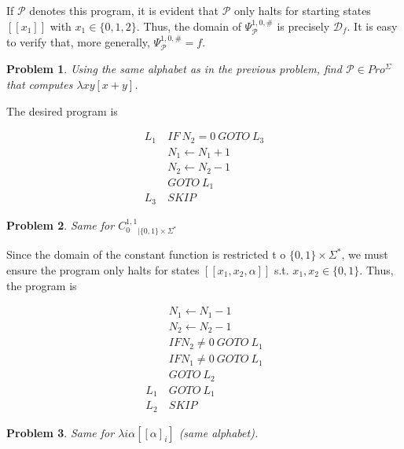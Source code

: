\documentclass[a4paper, 12pt]{article}
\newtheorem{problem}{Problem}
\newtheorem{problem}{Problem}
\begin{document}
If $\mathcal{P}$ denotes this program, it is evident that $\mathcal{P}$ only
halts for starting states $[\![ x_1 ]\!]$ with $x_1 \in \{0, 1, 2\}$.
Thus, the domain of $\Psi_{\mathcal{P}}^{1, 0, \#}$ is precisely
$\mathcal{D}_f$. It is easy to verify that, more generally,
$\Psi_{\mathcal{P}}^{1, 0, \#} = f$.

\begin{problem}
    Using the same alphabet as in the previous problem, find $\mathcal{P} \in
    Pro^{\Sigma}$ that computes $\lambda xy[x + y]$.
\end{problem}

The desired program is 

\begin{align*}
    L_1 ~ &IF ~ N_2 = 0 ~ GOTO ~ L_3 \\ 
          &N_1 \leftarrow N_1 + 1 \\ 
          &N_2 \leftarrow N_2 - 1 \\ 
          &GOTO ~ L_1\\
    L_3 ~ & SKIP
\end{align*}

\begin{problem}
    Same for $C_0^{1, 1}_{\mid \{0, 1\} \times  \Sigma^{*}}$
\end{problem}

Since the domain of the constant function is restricted t o $\{0, 1\} \times
\Sigma^{*}$, we must ensure the program only halts for states $[\![ x_1, x_2,
\alpha ]\!]$ s.t. $x_1,x_2 \in \{0, 1\}$. Thus, the program is 

\begin{align*}
    &N_1 \leftarrow N_1 - 1 \\
    &N_2 \leftarrow N_2 - 1 \\
    &IF N_2 \neq 0 ~ GOTO ~ L_1 \\ 
    & IF N_1 \neq 0 ~ GOTO ~ L_1 \\ 
    &GOTO ~ L_2 \\ 
    L_1~& GOTO ~ L_1 \\ 
    L_2~ &SKIP
\end{align*}

\begin{problem}
    Same for $\lambda i\alpha[[\alpha]_i]$ (same alphabet).
\end{problem}
\end{document}
